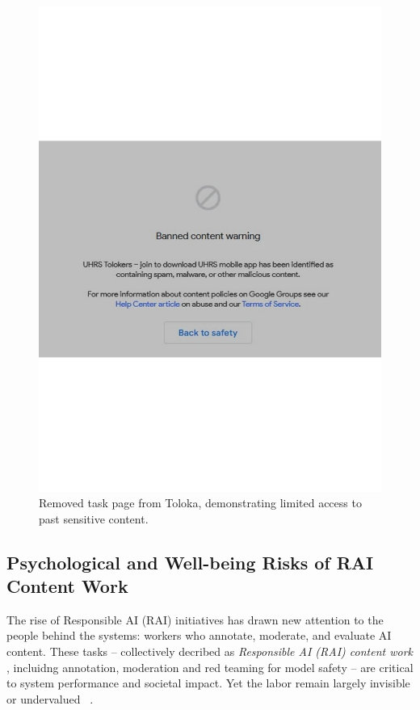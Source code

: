 \begin{figure}
  \centering
  \includegraphics[width=0.7\linewidth]{figures/toloka_removed_task.pdf}
  \caption{Removed task page from Toloka, demonstrating limited access to past sensitive content.}
  \label{fig:toloka_removed}
\end{figure}


\subsection{Psychological and Well-being Risks of RAI Content Work} 
The rise of Responsible AI (RAI) initiatives has drawn new attention to the people behind the systems: workers who annotate, moderate, and evaluate AI content. These tasks -- collectively decribed as \textit{Responsible AI (RAI) content work} \cite{qian2025aura}, incluidng annotation, moderation and red teaming for model safety -- are critical to system performance and societal impact. Yet the labor remain largely invisible or undervalued ~\cite{gray2019ghost}. 

